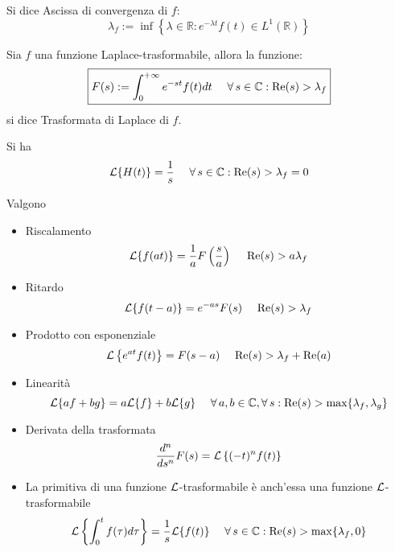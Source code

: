 \begin{defn}
Si dice Ascissa di convergenza di $\displaystyle f$:
\begin{equation*}
\lambda _{f} :=\inf\left\{\lambda \in \mathbb{R} :e^{-\lambda t} f( t) \in L^{1}(\mathbb{R})\right\}
\end{equation*}
\end{defn}
\begin{defn}
Sia $\displaystyle f$ una funzione Laplace-trasformabile, allora la funzione:
\begin{equation*}
\boxed{F( s) :=\int ^{+\infty }_{0} e^{-st} f( t) dt\ \ \ \ \forall s\in \CC  :\mathrm{Re}( s)  >\lambda _{f}}
\end{equation*}
si dice Trasformata di Laplace di $\displaystyle f$.
\end{defn}
\begin{rem}
 Si ha
\begin{equation*}
\Lc\{H( t)\} =\frac{1}{s} \ \ \ \ \forall s\in \CC  :\mathrm{Re}( s)  >\lambda _{f} =0
\end{equation*}
\end{rem}
\begin{thm}
[Proprietà] Valgono
\begin{itemize}
\item Riscalamento\begin{equation*}
\mathcal{L}\{f( at)\} =\frac{1}{a} F\left(\frac{s}{a}\right) \ \ \ \ \mathrm{Re}( s)  >a\lambda _{f}
\end{equation*}
\item Ritardo\begin{equation*}
\mathcal{L}\{f( t-a)\} =e^{-as} F( s) \ \ \ \ \mathrm{Re}( s)  >\lambda _{f}
\end{equation*}
\item Prodotto con esponenziale\begin{equation*}
\Lc\left\{e^{at} f( t)\right\} =F( s-a) \ \ \ \ \mathrm{Re}( s)  >\lambda _{f} +\mathrm{Re}( a)
\end{equation*}
\item Linearità\begin{equation*}
\Lc\{af+bg\} =a\Lc\{f\} +b\Lc\{g\} \ \ \ \ \forall a,b\in \CC  ,\forall s:\mathrm{Re}( s)  >\max\{\lambda _{f} ,\lambda _{g}\}
\end{equation*}
\item Derivata della trasformata\begin{equation*}
\frac{d^{n}}{ds^{n}} F( s) =\mathcal{L}\left\{( -t)^{n} f( t)\right\}
\end{equation*}
\item La primitiva di una funzione $\mathcal{L}$-trasformabile è anch'essa una funzione $\mathcal{L}$-trasformabile\begin{equation*}
\Lc\left\{\int ^{t}_{0} f( \tau ) d\tau \right\} =\frac{1}{s}\Lc\{f( t)\} \ \ \ \ \forall s\in \CC  :\mathrm{Re}( s)  >\max\{\lambda _{f} ,0\}
\end{equation*}
\end{itemize}
\end{thm}
